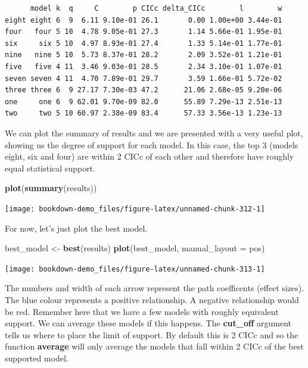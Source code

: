 \documentclass[
]{book}
\newenvironment{Shaded}{\begin{snugshade}}{\end{snugshade}}
\newcommand{\DataTypeTok}[1]{\textcolor[rgb]{0.13,0.29,0.53}{#1}}
\newcommand{\KeywordTok}[1]{\textcolor[rgb]{0.13,0.29,0.53}{\textbf{#1}}}
\newcommand{\NormalTok}[1]{#1}
\newcommand{\StringTok}[1]{\textcolor[rgb]{0.31,0.60,0.02}{#1}}
\begin{document}
\begin{verbatim}
      model k  q     C        p CICc delta_CICc        l        w
eight eight 6  9  6.11 9.10e-01 26.1       0.00 1.00e+00 3.44e-01
four   four 5 10  4.78 9.05e-01 27.3       1.14 5.66e-01 1.95e-01
six     six 5 10  4.97 8.93e-01 27.4       1.33 5.14e-01 1.77e-01
nine   nine 5 10  5.73 8.37e-01 28.2       2.09 3.52e-01 1.21e-01
five   five 4 11  3.46 9.03e-01 28.5       2.34 3.10e-01 1.07e-01
seven seven 4 11  4.70 7.89e-01 29.7       3.59 1.66e-01 5.72e-02
three three 6  9 27.17 7.30e-03 47.2      21.06 2.68e-05 9.20e-06
one     one 6  9 62.01 9.70e-09 82.0      55.89 7.29e-13 2.51e-13
two     two 5 10 60.97 2.38e-09 83.4      57.33 3.56e-13 1.23e-13
\end{verbatim}

We can plot the summary of results and we are presented with a very useful plot, showing us the degree of support for each model. In this case, the top 3 (models eight, six and four) are within 2 CICc of each other and therefore have roughly equal statistical support.

\begin{Shaded}
\begin{Highlighting}[]
\KeywordTok{plot}\NormalTok{(}\KeywordTok{summary}\NormalTok{(results))}
\end{Highlighting}
\end{Shaded}

\begin{center}\texttt{[image: bookdown-demo\_files/figure-latex/unnamed-chunk-312-1]} \end{center}

For now, let's just plot the best model.

\begin{Shaded}
\begin{Highlighting}[]
\NormalTok{best\_model \textless{}{-}}\StringTok{ }\KeywordTok{best}\NormalTok{(results)}
\KeywordTok{plot}\NormalTok{(best\_model, }\DataTypeTok{manual\_layout =}\NormalTok{ pos)}
\end{Highlighting}
\end{Shaded}

\begin{center}\texttt{[image: bookdown-demo\_files/figure-latex/unnamed-chunk-313-1]} \end{center}

The numbers and width of each arrow represent the path coefficents (effect sizes). The blue colour represents a positive relationship. A negative relationship would be red. Remember here that we have a few models with roughly equivalent support. We can average these models if this happens. The \textbf{cut\_off} argument tells us where to place the limit of support. By default this is 2 CICc and so the function \textbf{average} will only average the models that fall within 2 CICc of the best supported model.
\end{document}

